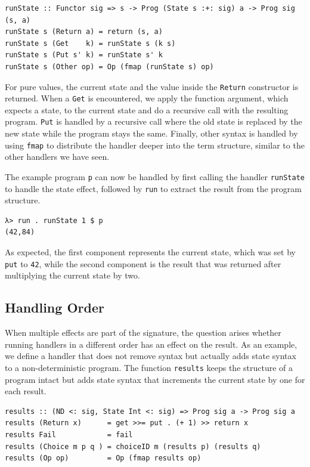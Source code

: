 \documentclass[a4paper, 11pt, fleqn, twoside]{scrreprt}
\newcommand{\hinl}[1]{\texttt{#1}}
\begin{document}
\begin{verbatim}
runState :: Functor sig => s -> Prog (State s :+: sig) a -> Prog sig (s, a)
runState s (Return a) = return (s, a)
runState s (Get    k) = runState s (k s)
runState s (Put s' k) = runState s' k
runState s (Other op) = Op (fmap (runState s) op)
\end{verbatim}

For pure values, the current state and the value inside the \hinl{Return} constructor is returned.
When a \hinl{Get} is encountered, we apply the function argument, which expects a state, to the current state and do a recursive call with the resulting program.
\hinl{Put} is handled by a recursive call where the old state is replaced by the new state while the program stays the same.
Finally, other syntax is handled by using \hinl{fmap} to distribute the handler deeper into the term structure, similar to the other handlers we have seen.

The example program \hinl{p} can now be handled by first calling the handler \hinl{runState} to handle the state effect, followed by \hinl{run} to extract the result from the program structure.

\begin{verbatim}
λ> run . runState 1 $ p
(42,84)
\end{verbatim}

As expected, the first component represents the current state, which was set by \hinl{put} to \hinl{42}, while the second component is the result that was returned after multiplying the current state by two.

\subsection{Handling Order}
When multiple effects are part of the signature, the question arises whether running handlers in a different order has an effect on the result.
As an example, we define a handler that does not remove syntax but actually adds state syntax to a non-deterministic program.
The function \hinl{results} keeps the structure of a program intact but adds state syntax that increments the current state by one for each result.

\begin{verbatim}
results :: (ND <: sig, State Int <: sig) => Prog sig a -> Prog sig a
results (Return x)      = get >>= put . (+ 1) >> return x
results Fail            = fail
results (Choice m p q ) = choiceID m (results p) (results q)
results (Op op)         = Op (fmap results op)
\end{verbatim}
\end{document}
